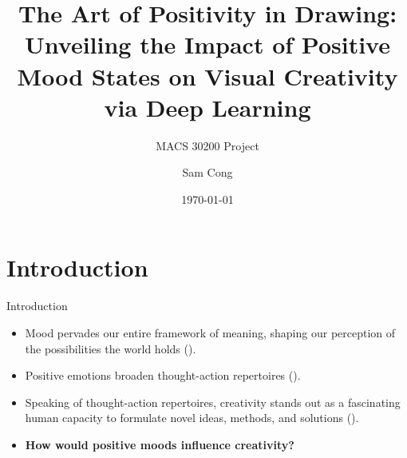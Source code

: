 \documentclass[pdf]{beamer}
\title{The Art of Positivity in Drawing: Unveiling the Impact of Positive Mood States on Visual Creativity via Deep Learning\vspace{1em}}
\subtitle{MACS 30200 Project}
\author{Sam Cong}
\institute{University of Chicago}
\date{\today}
\begin{document}
\begin{frame}
\titlepage
\end{frame}


\section{Introduction}
\begin{frame}{Introduction}
\begin{itemize}
    \item<1-> \alert{Mood} pervades our entire framework of meaning, shaping our perception of the possibilities the world holds (\cite{ratcliffe_why_2013}).
    \item<1-> Positive emotions broaden thought-action repertoires (\cite{fredrickson_role_2001}).
    \item<2-> Speaking of thought-action repertoires, \alert{creativity} stands out as a fascinating human capacity to formulate novel ideas, methods, and solutions (\cite{hennessey_creativity_2010}).
    \item<3-> \textbf{How would positive moods influence creativity?}
\end{itemize}
\end{frame}


\end{document}
